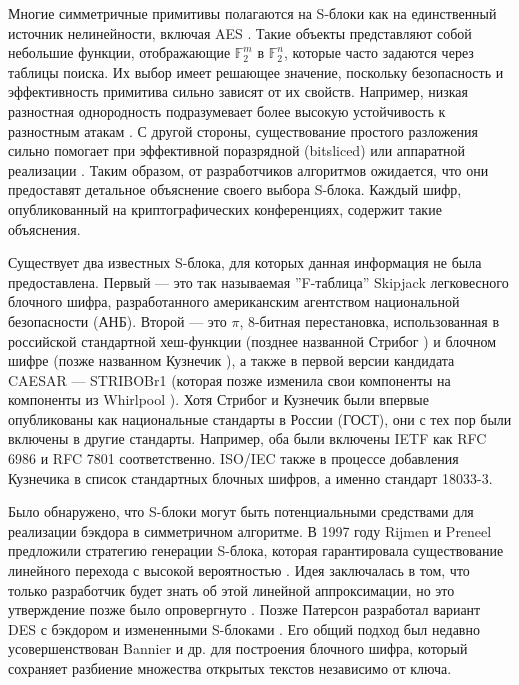 \introduction

Многие симметричные примитивы полагаются на S-блоки как на единственный источник нелинейности, включая AES \cite{AES01}. Такие объекты представляют собой небольшие функции, отображающие \(\mathbb{F}_2^m\) в \(\mathbb{F}_2^n\), которые часто задаются через таблицы поиска. Их выбор имеет решающее значение, поскольку безопасность и эффективность примитива сильно зависят от их свойств. Например, низкая разностная однородность \cite{Nyb94} подразумевает более высокую устойчивость к разностным атакам \cite{BS91a, BS91b}. С другой стороны, существование простого разложения сильно помогает при эффективной поразрядной (bitsliced) или аппаратной реализации \cite{LW14, CDL16}. Таким образом, от разработчиков алгоритмов ожидается, что они предоставят детальное объяснение своего выбора S-блока. Каждый шифр, опубликованный на криптографических конференциях, содержит такие объяснения.

Существует два известных S-блока, для которых данная информация не была предоставлена. Первый — это так называемая ''F-таблица'' Skipjack \cite{US98} легковесного блочного шифра, разработанного американским агентством национальной безопасности (АНБ). Второй — это \(\pi\), 8-битная перестановка, использованная в российской стандартной хеш-функции (позднее названной Стрибог \cite{Fed12}) и блочном шифре (позже названном Кузнечик \cite{Fed15}), а также в первой версии кандидата CAESAR — STRIBOBr1 \cite{Saa14} (которая позже изменила свои компоненты на компоненты из Whirlpool \cite{SB15}). Хотя Стрибог и Кузнечик были впервые опубликованы как национальные стандарты в России (ГОСТ), они с тех пор были включены в другие стандарты. Например, оба были включены IETF как RFC 6986 \cite{DD13} и RFC 7801 \cite{Dol16} соответственно. ISO/IEC также в процессе добавления Кузнечика в список стандартных блочных шифров, а именно стандарт 18033-3.

Было обнаружено, что S-блоки могут быть потенциальными средствами для реализации бэкдора в симметричном алгоритме. В 1997 году Rijmen и Preneel предложили стратегию генерации S-блока, которая гарантировала существование линейного перехода с высокой вероятностью \cite{RP97}. Идея заключалась в том, что только разработчик будет знать об этой линейной аппроксимации, но это утверждение позже было опровергнуто \cite{WBDY98}. Позже Патерсон разработал вариант DES с бэкдором и измененными S-блоками \cite{Pat99}. Его общий подход был недавно усовершенствован Bannier и др. \cite{BBF16} для построения блочного шифра, который сохраняет разбиение множества открытых текстов независимо от ключа.

